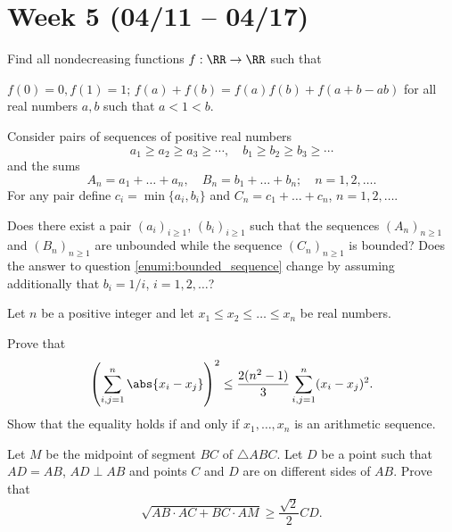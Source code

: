 \section{Week 5 (04/11 -- 04/17)}

\begin{probEG}
	Find all nondecreasing functions $f:\RR\to\RR$ such that
	\begin{enumerate}[(i)]
		\ii $f(0)=0,f(1)=1$;
		\ii $f(a)+f(b)=f(a)f(b)+f(a+b-ab)$ for all real numbers $a,b$ such that $a<1<b$.
	\end{enumerate}
\end{probEG}

\begin{probEG}
	Consider pairs of sequences of positive real numbers
	\[a_1\ge a_2\ge a_3\ge\cdots,\quad b_1\ge b_2\ge b_3\ge\cdots\]
	and the sums
	\[A_n=a_1+\dots+a_n,\quad B_n=b_1+\dots+b_n;\quad n=1,2,\dots.\]
	For any pair define $c_i=\min\{a_i,b_i\}$ and $C_n=c_1+\dots+c_n$, $n=1,2,\dots$.
	\begin{enumerate}[(1)]
		\ii \label{enumi:bounded_sequence} Does there exist a pair $(a_i)_{i\ge 1}$, $(b_i)_{i\ge 1}$ such that the sequences $(A_n)_{n\ge 1}$ and $(B_n)_{n\ge 1}$ are unbounded while the sequence $(C_n)_{n\ge 1}$ is bounded?
		\ii Does the answer to question \ref{enumi:bounded_sequence} change by assuming additionally that $b_i=1/i$, $i=1,2,\dots$?
	\end{enumerate}
\end{probEG}

\begin{probMR}
	Let $n$ be a positive integer and let $x_1\le x_2\le\dots\le x_n$ be real numbers.
	\begin{enumerate}[(1)]
		\ii Prove that
		\[\left(\sum_{i,j=1}^n\abs{x_i-x_j}\right)^2\le\frac{2(n^2-1)}{3}\sum_{i,j=1}^n(x_i-x_j)^2.\]
		\ii Show that the equality holds if and only if $x_1,\dots,x_n$ is an arithmetic sequence.
	\end{enumerate}
\end{probMR}

\begin{probEG}[Kosovo MO 2021/10.4]
	Let $M$ be the midpoint of segment $BC$ of $\triangle ABC$. Let $D$ be a point such that $AD=AB$, $AD\perp AB$ and points $C$ and $D$ are on different sides of $AB$. Prove that
	\[\sqrt{AB\cdot AC+BC\cdot AM}\ge\frac{\sqrt{2}}{2}CD.\]
\end{probEG}

